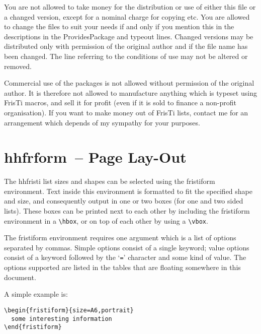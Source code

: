 \documentclass[11pt]{article}
\makeatletter
\def\packagename#1{{\sffamily #1}}     %
\def\macroname#1{{\ttfamily\@ttbs#1}}  %
\def\envirname#1{{\ttfamily #1}}       %
\def\hhfristi{\packagename{hhfristi}\xspace}
\def\hhfrform{\packagename{hhfrform}\xspace}
\def\={\verb=}
\def\<#1>{\macroname{#1}}
\makeatother
\begin{document}
You are not allowed to take money for the distribution or use of either
this file or a changed version, except for a nominal charge for copying
etc. You are allowed to change the files to suit your needs if and
only if you mention this in the descriptions in the \<ProvidesPackage>
and \<typeout> lines. Changed versions may be distributed only with
permission of the original author and if the file name has been changed.
The line referring to the conditions of use may not be altered or removed.

Commercial use of the packages is not allowed without permission
of the original author. It is therefore not allowed to manufacture
anything which is typeset using FrisTi macros, and sell it for
profit (even if it is sold to finance a non-profit organisation).
If you want to make money out of FrisTi lists, contact me for
an arrangement which depends of my sympathy for your purposes.

\section{\hhfrform\ -- Page Lay-Out}

The \hhfristi list sizes and shapes can be selected using the
\envirname{fristiform} environment. Text inside this environment is
formatted to fit the specified shape and size, and consequently output
in one or two boxes (for one and two sided lists). These boxes can be
printed next to each other by including the \envirname{fristiform}
environment in a \=\hbox=, or on top of each other by using a \=\vbox=.

The \envirname{fristiform} environment requires one argument which is
a list of options separated by commas.
Simple options consist of a single keyword; value options consist of
a keyword followed by the `\verb.=.' character and some kind of value.
The options supported are listed in the tables that are floating
somewhere in this document.

A simple example is:
\begin{verbatim}
\begin{fristiform}{size=A6,portrait}
  some interesting information
\end{fristiform}
\end{verbatim}
\end{document}

